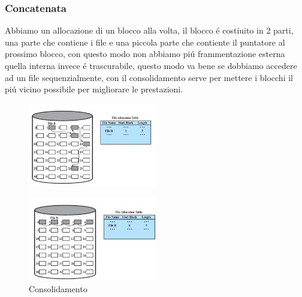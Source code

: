 \subsubsection*{Concatenata}
Abbiamo un allocazione di un blocco alla volta, il blocco é costiuito in 2 parti, una parte che contiene i file e una piccola
parte che contiente il puntatore al prossimo blocco, con questo modo non abbiamo piú frammentazione esterna quella interna
invece é trascurabile, questo modo va bene se dobbiamo accedere ad un file sequenzialmente, con il consolidamento serve per mettere
i blocchi il piú vicino possibile per migliorare le prestazioni.
\begin{figure}[H]
    \centering
    \includegraphics[width=0.5\textwidth]{immagini/AllocazioneConcatenata}
\end{figure}
\begin{figure}[H]
    \centering
    \includegraphics[width=0.5\textwidth]{immagini/AllocazioneDinamicaConsolidamento}
    \caption{Consolidamento}
\end{figure}
